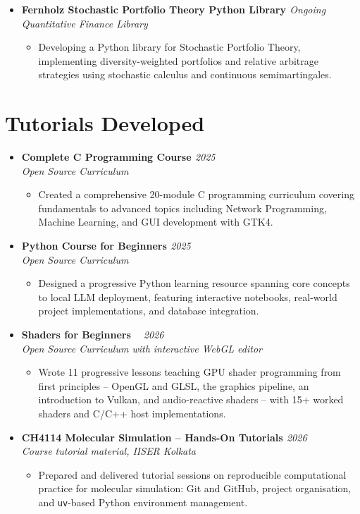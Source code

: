 \documentclass[a4paper,10pt]{article}
\newcommand{\resumeProject}[4]{
    \item\small{
        \textbf{#1} \hfill \textit{#2}\\
        \textit{#3}\\
        \begin{itemize}[leftmargin=1.5em,label=\textbullet,nosep,itemsep=0.5pt]
            #4
        \end{itemize}
    }\vspace{2pt}
}
\newcommand{\compactSection}[2]{
    \section{#1}
    \vspace{-0.1cm}
    #2
    \vspace{-0.2cm}
}
\begin{document}
{\begin{itemize}[leftmargin=*,label={},itemsep=4pt]
    \resumeProject{Fernholz Stochastic Portfolio Theory Python Library \href{https://github.com/XAheli/Fernholz-SPT}{\faGithub}}{Ongoing}
    {Quantitative Finance Library}
    {\item Developing a Python library for Stochastic Portfolio Theory, implementing diversity-weighted portfolios and relative arbitrage strategies using stochastic calculus and continuous semimartingales.}

\end{itemize}
}

\compactSection{Tutorials Developed}{
\begin{itemize}[leftmargin=*,label={},itemsep=4pt]
    \resumeProject{Complete C Programming Course \href{https://github.com/Shuvam-Banerji-Seal/C-Programming-for-Beginners}{\faGithub}}{2025}
    {Open Source Curriculum}
    {\item Created a comprehensive 20-module C programming curriculum covering fundamentals to advanced topics including Network Programming, Machine Learning, and GUI development with GTK4.}

    \resumeProject{Python Course for Beginners \href{https://github.com/Shuvam-Banerji-Seal/Python-Course-for-Beginners}{\faGithub}}{2025}
    {Open Source Curriculum}
    {\item Designed a progressive Python learning resource spanning core concepts to local LLM deployment, featuring interactive notebooks, real-world project implementations, and database integration.}

    \resumeProject{Shaders for Beginners \href{https://github.com/Shuvam-Banerji-Seal/shaders-for-beginners}{\faGithub}\ \href{https://shuvam-banerji-seal.github.io/shaders-for-beginners/}{\faGlobe}}{2026}
    {Open Source Curriculum with interactive WebGL editor}
    {\item Wrote 11 progressive lessons teaching GPU shader programming from first principles -- OpenGL and GLSL, the graphics pipeline, an introduction to Vulkan, and audio-reactive shaders -- with 15+ worked shaders and C/C++ host implementations.}

    \resumeProject{CH4114 Molecular Simulation -- Hands-On Tutorials \href{https://github.com/Shuvam-Banerji-Seal/CH4114_Molecular_Simulation_Tutorials}{\faGithub}}{2026}
    {Course tutorial material, IISER Kolkata}
    {\item Prepared and delivered tutorial sessions on reproducible computational practice for molecular simulation: Git and GitHub, project organisation, and \texttt{uv}-based Python environment management.}
\end{itemize}
}
\end{document}
